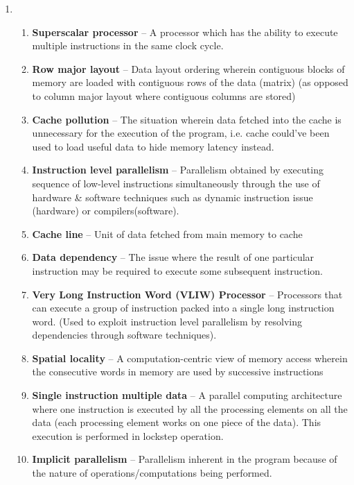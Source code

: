 \documentclass{article}
\begin{document}
\begin{enumerate}[label=\Large\textbf{\arabic*}.]
\item
\begin{enumerate}[label={\arabic*}.]
	\item \textbf{Superscalar processor} -- A processor which has the ability to execute multiple instructions in the same clock cycle.
	\item \textbf{Row major layout} -- Data layout ordering wherein contiguous blocks of memory are loaded with contiguous rows of the data (matrix) (as opposed to column major layout where contiguous columns are stored)
	\item \textbf{Cache pollution} -- The situation wherein data fetched into the cache is unnecessary for the execution of the program, i.e. cache could've been used to load useful data to hide memory latency instead.
	\item \textbf{Instruction level parallelism} -- Parallelism obtained by executing sequence of low-level instructions simultaneously through the use of hardware \& software techniques such as dynamic instruction issue (hardware) or compilers(software).
	\item \textbf{Cache line} -- Unit of data fetched from main memory to cache
	\item \textbf{Data dependency} -- The issue where the result of one particular instruction may be required to execute some subsequent instruction.
	\item \textbf{Very Long Instruction Word (VLIW) Processor} -- Processors that can execute a group of instruction packed into a single long instruction word. (Used to exploit instruction level parallelism by resolving dependencies through software techniques).
	\item \textbf{Spatial locality} -- A computation-centric view of memory access wherein the consecutive words in memory are used by successive instructions
	\item \textbf{Single instruction multiple data} -- A parallel computing architecture where one instruction is executed by all the processing elements on all the data (each processing element works on one piece of the data). This execution is performed in lockstep operation.
	\item \textbf{Implicit parallelism} -- Parallelism inherent in the program because of the nature of operations/computations being performed.
\end{enumerate}


\end{enumerate}
\end{document}
